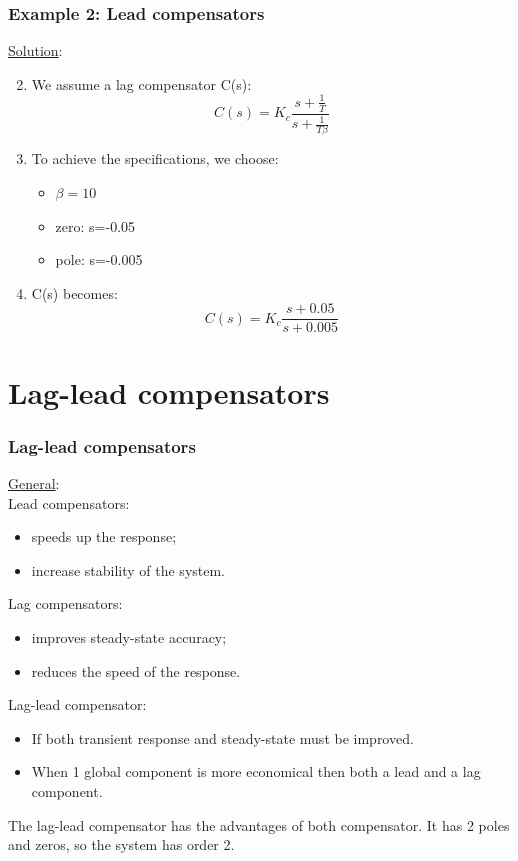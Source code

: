 \begin{frame}
	\frametitle{Example 2: Lead compensators}
	\underline{Solution}:
	\begin{enumerate}
		\setcounter{enumi}{1}
		\item We assume a lag compensator C(s): $$C(s)=K_c\frac{s+\frac{1}{T}}{s+\frac{1}{T\beta}}$$
		\item To achieve the specifications, we choose: 
		\begin{itemize}
			\item $\beta=10$
			\item zero: s=-0.05
			\item pole: s=-0.005
		\end{itemize}
		\item C(s) becomes: 
		$$C(s)=K_c\frac{s+0.05}{s+0.005}$$
	\end{enumerate}
\end{frame}

\section{Lag-lead compensators}

\begin{frame}
	\frametitle{Lag-lead compensators}
		\underline{General}:\\
		Lead compensators: 
		\begin{itemize}
			\item speeds up the response;
			\item increase stability of the system.
		\end{itemize}
		Lag compensators:
		\begin{itemize}
			\item improves steady-state accuracy;
			\item reduces the speed of the response.
		\end{itemize}
		Lag-lead compensator:
		\begin{itemize}
			\item If both transient response and steady-state must be improved.
			\item When 1 global component is more economical then both a lead and a lag component.
		\end{itemize}
		The lag-lead compensator has the advantages of both compensator. It has 2 poles and zeros, so the system has order 2.
\end{frame}

